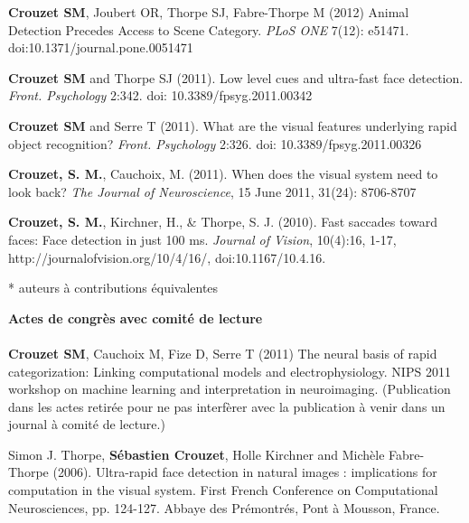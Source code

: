 \documentclass[margin,line]{resume}
\begin{document}
\begin{resume}
	\vspace{-2mm} \textbf{Crouzet SM}, Joubert OR, Thorpe SJ, Fabre-Thorpe M (2012) Animal Detection Precedes Access to Scene Category. \textit{PLoS ONE} 7(12): e51471. doi:10.1371/journal.pone.0051471

	\vspace{-2mm} \textbf{Crouzet SM} and Thorpe SJ (2011). Low level cues and ultra-fast face detection. \textit{Front. Psychology} 2:342. doi: 10.3389/fpsyg.2011.00342

	\vspace{-2mm} \textbf{Crouzet SM} and Serre T (2011). What are the visual features underlying rapid object recognition? \textit{Front. Psychology} 2:326. doi: 10.3389/fpsyg.2011.00326

	\vspace{-2mm} \textbf{Crouzet, S. M.}, Cauchoix, M. (2011). When does the visual system need to look back?  \textit{The Journal of Neuroscience}, 15 June 2011, 31(24): 8706-8707

	\vspace{-2mm} \textbf{Crouzet, S. M.}, Kirchner, H., \& Thorpe, S. J.  (2010). Fast saccades toward faces: Face detection in just 100 ms. \textit{Journal of Vision}, 10(4):16, 1-17, http://journalofvision.org/10/4/16/, doi:10.1167/10.4.16.

	\vspace{-2mm} * auteurs à contributions équivalentes 


\vspace{3mm}	
\textbf{Actes de congrès avec comité de lecture}\\\\
  \textbf{Crouzet SM}, Cauchoix M, Fize D, Serre T (2011) The neural basis of rapid categorization: Linking computational models and electrophysiology. NIPS 2011 workshop on machine learning and interpretation in neuroimaging. (Publication dans les actes retirée pour ne pas interfèrer avec la publication à venir dans un journal à comité de lecture.)

	\vspace{-2mm} Simon J. Thorpe, \textbf{Sébastien Crouzet}, Holle Kirchner and Michèle Fabre-Thorpe (2006). Ultra-rapid face detection in natural images : implications for computation in the visual system. First French Conference on Computational Neurosciences, pp. 124-127. Abbaye des Prémontrés, Pont à Mousson, France.



\end{resume}
\end{document}
